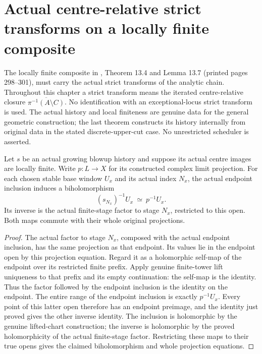 \section{Actual centre-relative strict transforms on a locally finite composite}

The locally finite composite in \cite{bierstone-milman97-invent-math},
Theorem 13.4 and Lemma 13.7 (printed pages 298--301), must carry the actual
strict transforms of the analytic chain. Throughout this chapter a strict
transform means the iterated centre-relative closure
$\overline{\pi^{-1}(A\setminus C)}$. No identification with an
exceptional-locus strict transform is used. The actual history and local
finiteness are genuine data for the general geometric construction; the
last theorem constructs its history internally from original data in the
stated discrete-upper-cut case. No unrestricted scheduler is asserted.

\begin{theorem}
\label{hir:actual-lf-limit-stable-window-biholomorphism}
\leanok
Let $s$ be an actual growing blowup history and suppose its actual centre
images are locally finite. Write $p:L\to X$ for its constructed complex
limit projection. For each chosen stable base window $U_x$ and its actual
index $N_x$, the actual endpoint inclusion induces a biholomorphism
\[
 (s_{N_x})^{-1}U_x\ \simeq\ p^{-1}U_x.
\]
Its inverse is the actual finite-stage factor to stage $N_x$, restricted
to this open. Both maps commute with their whole original projections.
\end{theorem}
\begin{proof}
The actual factor to stage $N_x$, composed with the actual endpoint
inclusion, has the same projection as that endpoint. Its values lie in
the endpoint open by this projection equation. Regard it as a holomorphic
self-map of the endpoint over its restricted finite prefix. Apply genuine
finite-tower lift uniqueness to that prefix and its empty continuation:
the self-map is the identity. Thus the factor followed by the endpoint
inclusion is the identity on the endpoint. The entire range of the
endpoint inclusion is exactly $p^{-1}U_x$. Every point of this latter open
therefore has an endpoint preimage, and the identity just proved gives
the other inverse identity. The inclusion is holomorphic by the genuine
lifted-chart construction; the inverse is holomorphic by the proved
holomorphicity of the actual finite-stage factor. Restricting these maps
to their true opens gives the claimed biholomorphism and whole projection
equations.
\end{proof}

